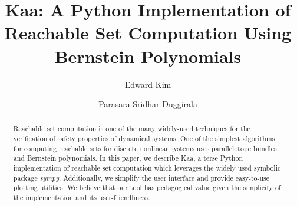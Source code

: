 \documentclass[EPiC]{easychair}
\begin{document}
%
\title{Kaa: A Python Implementation of Reachable Set Computation Using Bernstein Polynomials}
%
%
\author{Edward Kim
\and
Parasara Sridhar Duggirala
}
%
%
%
\maketitle              %
%
\begin{abstract}
Reachable set computation is one of the many widely-used techniques for the verification of safety properties of dynamical systems. 
%
One of the simplest algorithms for computing reachable sets for discrete nonlinear systems uses parallelotope bundles and Bernstein polynomials.
%
In this paper, we describe Kaa, a terse Python implementation of reachable set computation which leverages the widely used symbolic package \emph{sympy}.
%
Additionally, we simplify the user interface and provide easy-to-use plotting utilities.
%
%
We believe that our tool has pedagogical value given the simplicity of the implementation and its user-friendliness.
%
\end{abstract}

\end{document}

